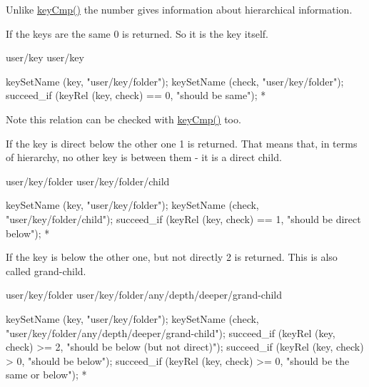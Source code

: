 Unlike \hyperlink{group__keytest_gaf6e66e12fe04d535a5d1c8218ced803e}{keyCmp()} the number gives information about hierarchical information.


\begin{DoxyItemize}
\item If the keys are the same 0 is returned. So it is the key itself. \begin{DoxyVerb}
user/key
user/key
\end{DoxyVerb}

\end{DoxyItemize}


\begin{DoxyCode}
keySetName (key, "user/key/folder");
keySetName (check, "user/key/folder");
succeed_if (keyRel (key, check) == 0, "should be same");
 *
\end{DoxyCode}


\begin{DoxyNote}{Note}
this relation can be checked with \hyperlink{group__keytest_gaf6e66e12fe04d535a5d1c8218ced803e}{keyCmp()} too.
\end{DoxyNote}

\begin{DoxyItemize}
\item If the key is direct below the other one 1 is returned. That means that, in terms of hierarchy, no other key is between them -\/ it is a direct child. \begin{DoxyVerb}
user/key/folder
user/key/folder/child
\end{DoxyVerb}

\end{DoxyItemize}


\begin{DoxyCode}
keySetName (key, "user/key/folder");
keySetName (check, "user/key/folder/child");
succeed_if (keyRel (key, check) == 1, "should be direct below");
 *
\end{DoxyCode}



\begin{DoxyItemize}
\item If the key is below the other one, but not directly 2 is returned. This is also called grand-\/child. \begin{DoxyVerb}
user/key/folder
user/key/folder/any/depth/deeper/grand-child
\end{DoxyVerb}

\end{DoxyItemize}


\begin{DoxyCode}
keySetName (key, "user/key/folder");
keySetName (check, "user/key/folder/any/depth/deeper/grand-child");
succeed_if (keyRel (key, check) >= 2, "should be below (but not direct)");
succeed_if (keyRel (key, check) > 0, "should be below");
succeed_if (keyRel (key, check) >= 0, "should be the same or below");
 *
\end{DoxyCode}



